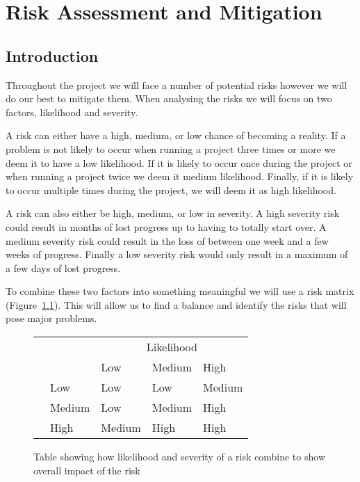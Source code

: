 \chapter{Risk Assessment and Mitigation}
\section{Introduction}
Throughout the project we will face a number of potential risks however we will do our best to mitigate them.
When analysing the risks we will focus on two factors, likelihood and severity.

A risk can either have a high, medium, or low chance of becoming a reality.
If a problem is not likely to occur when running a project three times or more we deem it to have a low likelihood.
If it is likely to occur once during the project or when running a project twice we deem it medium likelihood.
Finally, if it is likely to occur multiple times during the project, we will deem it as high likelihood.

A risk can also either be high, medium, or low in severity.
A high severity risk could result in months of lost progress up to having to totally start over.
A medium severity risk could result in the loss of between one week and a few weeks of progress.
Finally a low severity risk would only result in a maximum of a few days of lost progress.

To combine these two factors into something meaningful we will use a risk matrix (Figure~\ref{fig:risktable}).
This will allow us to find a balance and identify the risks that will pose major problems.

\begin{figure}[h]
	\centering
	\begin{tabular}{|l|l||l|l|l|}
		\hline
		\multicolumn{2}{|l||}{\multirow{2}{*}{}} & \multicolumn{3}{c|}{Likelihood} \\ \cline{3-5}
		\multicolumn{2}{|l||}{}                  & Low       & Medium   & High     \\ \hhline{|==||=|=|=|}
		\multirow{3}{*}{Severity}    & Low      & Low       & Low      & Medium   \\ \cline{2-5}
		& Medium   & Low       & Medium   & High     \\ \cline{2-5}
		& High     & Medium    & High     & High     \\ \hline
	\end{tabular}
	\caption{Table showing how likelihood and severity of a risk combine to show overall impact of the risk}
	\label{fig:risktable}
\end{figure}

